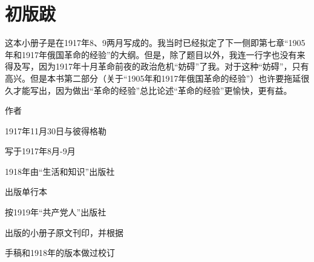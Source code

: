 \chapter{初版跋} %

\id 

这本小册子是在1917年8、9两月写成的。我当时已经拟定了下一侧即第七章“1905年和1917年俄国革命的经验”的大纲。但是，除了题目以外，我连一行字也没有来得及写，因为1917年十月革命前夜的政治危机“妨碍”了我。对于这种“妨碍”，只有高兴。但是本书第二部分（关于“1905年和1917年俄国革命的经验”）也许要拖延很久才能写出，因为做出“革命的经验”总比论述“革命的经验”更愉快，更有益。

\pskip
\leftskip=65mm

作者

\pskip
\leftskip=45mm

1917年11月30日与彼得格勒

\pskip
\leftskip=50mm
\small

写于1917年8月-9月

\pskip

1918年由“生活和知识”出版社

出版单行本

\pskip

按1919年“共产党人”出版社

出版的小册子原文刊印，并根据

手稿和1918年的版本做过校订

\leftskip=0mm
\normalsize